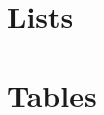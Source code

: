 \documentclass{article}
\begin{document}
%        
%
%
%
%


    \section{Lists}
    \label{Lists}


    \section{Tables}
    \label{Tables}
\end{document}
